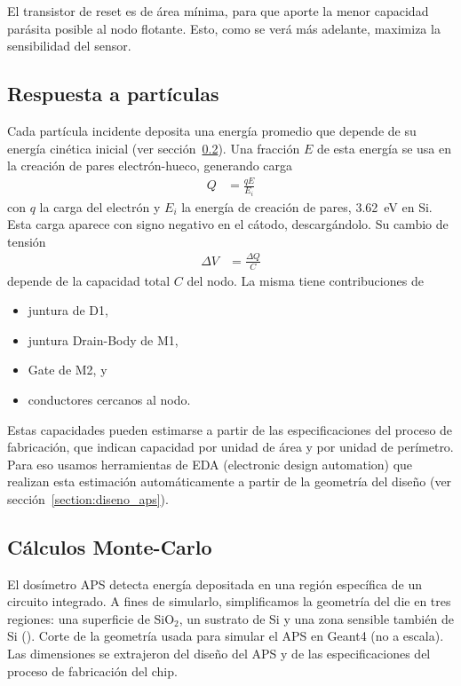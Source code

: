 El transistor de reset es de área mínima,
para que aporte la menor capacidad parásita posible al nodo flotante.
Esto, como se verá más adelante, maximiza la sensibilidad del sensor.
\subsection{Respuesta a partículas}
Cada partícula incidente deposita una energía promedio que depende de su energía
cinética inicial\cite{berger_response_1969} (ver sección~\ref{montecarloaps}).
Una fracción $E$ de esta energía se usa en la creación de pares electrón-hueco,
generando carga 
\begin{align*}
    Q &= \frac{qE}{E_i}
\end{align*}
con $q$ la carga del electrón y $E_i$ la energía de creación de pares,
\SI{3.62}{\electronvolt} en Si.
Esta carga aparece con signo negativo en el cátodo, descargándolo.
Su cambio de tensión
\begin{align*}
    \Delta V &= \frac{\Delta Q}{C}
\end{align*}
depende de la capacidad total $C$ del nodo.
La misma tiene contribuciones de
\begin{itemize}
    \item juntura de D1,
    \item juntura Drain-Body de M1,
    \item Gate de M2, y
    \item conductores cercanos al nodo.
\end{itemize}
Estas capacidades pueden estimarse a partir de las especificaciones del 
proceso de fabricación,
que indican capacidad por unidad de área y por unidad de perímetro.
Para eso usamos herramientas de EDA (electronic design automation)
que realizan esta estimación automáticamente a partir de la geometría del
diseño (ver sección~\ref{section:diseno_aps}).
\subsection{Cálculos Monte-Carlo}
\label{montecarloaps}
El dosímetro APS detecta energía depositada 
en una región específica de un circuito integrado.
A fines de simularlo, 
simplificamos la geometría del die en tres regiones:
una superficie de SiO$_2$, un sustrato de Si 
y una zona sensible también de Si ().
{Corte de la geometría usada para simular el APS en Geant4 (no a escala).}
Las dimensiones se extrajeron del diseño del APS 
y de las especificaciones del proceso de fabricación del chip.


